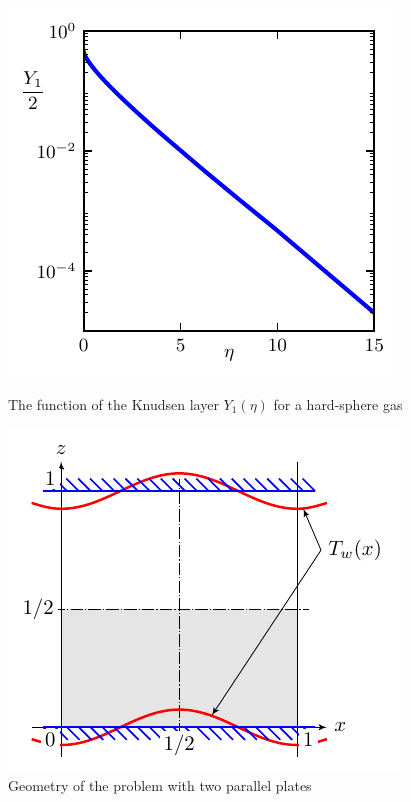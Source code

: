 \documentclass[smallextended, referee]{svjour3} %
\begin{document}
\begin{figure}[ht]
	\centering
	\begin{minipage}{.48\textwidth}
		\centering
		\includegraphics{Fig1}
		\caption{The function of the Knudsen layer \(Y_1(\eta)\) for a hard-sphere gas}
		\label{fig:Y1}
	\end{minipage}
	\quad
	\begin{minipage}{.48\textwidth}
		\centering
		\includegraphics{Fig2}
		\vspace{13pt}
		\caption{Geometry of the problem with two parallel plates}
		\label{fig:geometry}
	\end{minipage}
\end{figure}
\end{document}
